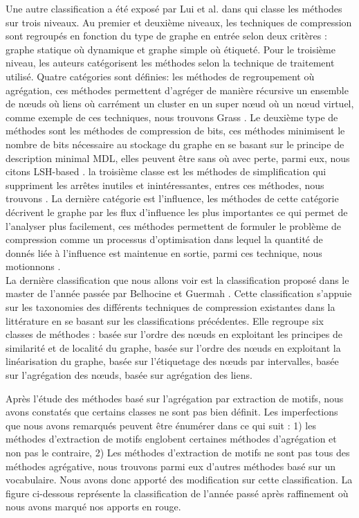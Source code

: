 Une autre classification a été exposé par Lui et al. dans \citep{liu2018graph} qui classe les méthodes sur trois niveaux. Au premier et deuxième niveaux, les techniques de compression sont regroupés en fonction du type de graphe en entrée selon deux critères : graphe statique où dynamique et graphe simple où étiqueté. Pour le troisième niveau, les auteurs catégorisent les méthodes selon la technique de traitement utilisé. Quatre catégories sont définies: les méthodes de regroupement où agrégation, ces méthodes permettent d'agréger de manière récursive un ensemble de nœuds où liens où carrément un cluster en un super nœud où un nœud virtuel, comme exemple de ces techniques, nous trouvons Grass \citep{lefevre2010grass}. Le deuxième type de méthodes sont les méthodes de compression de bits, ces méthodes minimisent le nombre de bits nécessaire au stockage du graphe en se basant sur le principe de description minimal MDL, elles peuvent être sans où avec perte, parmi eux, nous citons LSH-based \citep{khan2014set}. la troisième classe est les méthodes de simplification qui suppriment les arrêtes inutiles et inintéressantes, entres ces méthodes, nous trouvons \citep{shen2006visual}. La dernière catégorie est l'influence, les méthodes de cette catégorie décrivent le graphe par les flux d'influence les plus importantes ce qui permet de l'analyser plus facilement, ces méthodes permettent de formuler le problème de compression comme un processus d'optimisation dans lequel la quantité de donnés liée à l'influence est maintenue en sortie, parmi ces technique, nous motionnons \citep{shi2015vegas}.\\


La dernière classification que nous allons voir est la classification proposé dans le master de l'année passée par Belhocine et Guermah \citep{master2017}. Cette classification s'appuie sur les taxonomies des différents techniques de compression existantes dans la littérature en se basant sur les classifications précédentes. Elle regroupe six classes de méthodes :  basée sur l'ordre des nœuds en exploitant les principes de similarité et de localité du graphe, basée sur l'ordre des nœuds en exploitant la linéarisation du graphe, basée sur l'étiquetage des nœuds par intervalles, basée sur l'agrégation des nœuds, basée sur agrégation des liens. 

Après l'étude des méthodes basé sur l'agrégation par extraction de motifs, nous avons constatés que certains classes ne sont pas bien définit. Les imperfections que nous avons remarqués peuvent être énumérer dans ce qui suit : 1) les méthodes d'extraction de motifs englobent certaines méthodes d'agrégation et non pas le contraire, 2) Les méthodes d'extraction de motifs ne sont pas tous des méthodes agrégative, nous trouvons parmi eux d'autres méthodes basé sur un vocabulaire. Nous avons donc apporté des modification sur cette classification. La figure ci-dessous représente la classification de l'année passé après raffinement où nous avons marqué nos apports en rouge.

